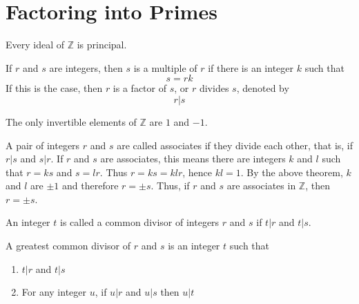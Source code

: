 \documentclass[12pt]{article}
\newcommand{\integers}{\mathds{Z}}
\begin{document}


\section{Factoring into Primes}

\begin{theorem} Every ideal of $\integers$ is principal. \end{theorem} 

\begin{definition} If $r$ and $s$ are integers, then $s$ is a multiple of $r$ if there is an integer $k$ such that $$s = rk$$ If this is the case, then $r$ is a factor of $s$, or $r$ divides $s$, denoted by $$r|s$$ \end{definition} 

\begin{theorem} The only invertible elements of $\integers$ are $1$ and $-1$. \end{theorem} 

\begin{definition} A pair of integers $r$ and $s$ are called associates if they divide each other, that is, if $r|s$ and $s|r$. If $r$ and $s$ are associates, this means there are integers $k$ and $l$ such that $r = ks$ and $s = lr$. Thus $r = ks = klr$, hence $kl = 1$. By the above theorem, $k$ and $l$ are $\pm 1$ and therefore $r = \pm s$. Thus, if $r$ and $s$ are associates in $\integers$, then $r = \pm s$. \end{definition} 

\begin{definition} An integer $t$ is called a common divisor of integers $r$ and $s $ if $t|r$ and $t|s$. \end{definition} 

\begin{definition} A greatest common divisor of $r$ and $s$ is an integer $t$ such that \begin{enumerate} 
\item $t|r$ and $t|s$ 
\item For any integer $u$, if $u|r$ and $u|s$ then $u|t$ \end{enumerate} \end{definition} 
\end{document}
